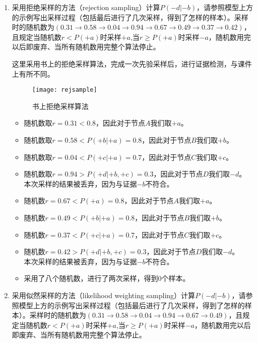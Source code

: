 \begin{enumerate}
    \item 采用拒绝采样的方法（rejection sampling）计算$P(-d|-b)$，请参照模型上方的示例写出采样过程（包括最后进行了几次采样，得到了怎样的样本）。采样时的随机数为$(0.31\rightarrow 0.58\rightarrow 0.04 \rightarrow 0.94 \rightarrow 0.67 \rightarrow 0.49\rightarrow 0.37 \rightarrow 0.42)$，且规定当随机数$r<P(+a)$时采样$+a$,当$r\geq P(+a)$时采样$-a$，随机数用完以后即废弃、当所有随机数用完整个算法停止。
    \begin{solution}
        这里采用书上的拒绝采样算法，完成一次先验采样后，进行证据检测，与课件上有所不同。
        \begin{figure}[H]
            \centering
            \texttt{[image: rejsample]}
            \caption{书上拒绝采样算法}\label{fig:rejsample}
        \end{figure}
        \begin{itemize}
            \item 随机数取$r=0.31<0.8$，因此对于节点$A$我们取$+a$。
            \item 随机数取$r=0.58<P(+b|+a)=0.8$，因此对于节点$B$我们取$+b$。
            \item 随机数取$r=0.04<P(+c|+a)=0.7$，因此对于节点$C$我们取$+c$。
            \item 随机数取$r=0.94>P(+d|+b,+c)=0.3$，因此对于节点$D$我们取$-d$。\\
            本次采样的结果被丢弃，因为与证据$-b$不符合。
            \item 随机数$r=0.67<P(+a)=0.8$，因此对于节点$A$我们取$+a$。
            \item 随机数$r=0.49<P(+b|+a)=0.8$，因此对于节点$B$我们取$+b$。
            \item 随机数$r=0.37<P(+c|+a)=0.7$，因此对于节点$C$我们取$+c$。
            \item 随机数$r=0.42>P(+d|+b, +c)=0.3$，因此对于节点$D$我们取$-d$。\\
            本次采样的结果被丢弃，因为与证据$-b$不符合。
            \item 采用了八个随机数，进行了两次采样，得到0个样本。
        \end{itemize}
    \end{solution}
    \item 采用似然采样的方法（likelihood weighting sampling）计算$P(-d|-b)$，请参照模型上方的示例写出采样过程（包括最后进行了几次采样，得到了怎样的样本）。采样时的随机数为$(0.31\rightarrow 0.58\rightarrow 0.04 \rightarrow 0.94 \rightarrow 0.67 \rightarrow 0.49)$，且规定当随机数$r<P(+a)$时采样$+a$,当$r\geq P(+a)$时采样$-a$，随机数用完以后即废弃、当所有随机数用完整个算法停止。

\end{enumerate}
